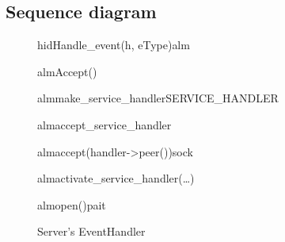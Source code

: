 \documentclass[Main]{subfiles}
\begin{document}
\subsection{Sequence diagram}

\newpage
\begin{figure}[htbp]
\begin {sequencediagram}


	\begin{messcall}{hid}{Handle\_event(h, eType)}{alm}

		\begin{callself}{alm}{Accept()}{}
			\begin{callself}{alm}{make\_service\_handler}{SERVICE\_HANDLER}
			\end{callself}

			\begin{callself}{alm}{accept\_service\_handler}{}
				\begin{call}{alm}{accept(handler->peer())}{sock}{}
				\end{call}
			\end{callself}

			\begin{callself}{alm}{activate\_service\_handler(\dots)}{}
				\begin{call}{alm}{open()}{pait}{}
				\end{call}
			\end{callself}
		\end{callself}







	\end{messcall}

\end{sequencediagram}

\caption{Server's EventHandler}
\label{fig:SererEventHandler}
\end{figure}
\end{document}
